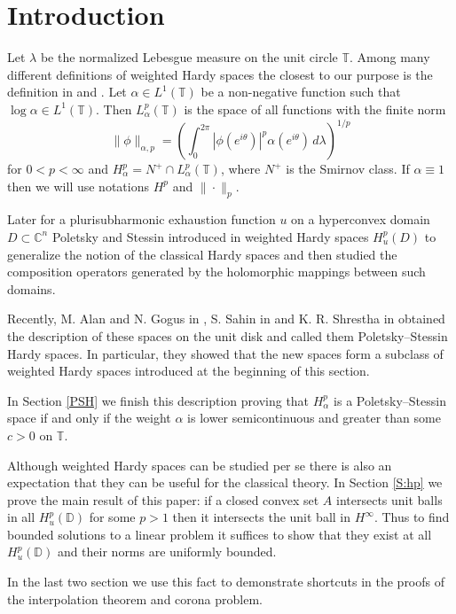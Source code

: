 \documentclass{amsart}
\theoremstyle{remark}
\begin{document}
\section{Introduction}
\par Let ${\lambda}$ be the normalized Lebesgue measure on the unit circle ${\mathbb T}$. Among many different definitions of weighted Hardy spaces the closest to our purpose is the definition in \cite{M} and \cite{BPST}. Let ${\alpha}\in L^1({\mathbb T})$ be a non-negative function such that $\log{\alpha}\in L^1({\mathbb T})$. Then $L^p_{\alpha}({\mathbb T})$ is the space of all functions with the finite norm \[\|\phi\|_{{\alpha},p}=\left(\int_0^{2\pi}|\phi(e^{i{\theta}})|^p{\alpha}(e^{i{\theta}})\,d{\lambda}\right)^{1/p}\] for $0<p<\infty$ and
$H^p_{\alpha}=N^+\cap L^p_{\alpha}({\mathbb T})$, where $N^+$ is the Smirnov class. If ${\alpha}\equiv1$ then we will use notations $H^p$ and $\|\cdot\|_p$.
\par Later for a plurisubharmonic exhaustion function $u$ on a hyperconvex domain $D{\subset}{\mathbb C}^n$ Poletsky and Stessin introduced in \cite{PS} weighted Hardy spaces $H^p_u(D)$ to generalize the notion of the classical Hardy spaces  and then studied the composition operators generated by the holomorphic mappings between such domains.
\par Recently, M. Alan and N. Gogus in \cite{AG}, S. Sahin in \cite{Sa} and K. R. Shrestha in \cite{Sh1,Sh2} obtained the description of these spaces on the unit disk and called them Poletsky--Stessin Hardy spaces. In particular, they showed that the new spaces form a subclass of weighted Hardy spaces introduced at the beginning of this section.
\par In Section \ref{PSH} we finish this description proving that $H^p_{\alpha}$ is a Poletsky--Stessin space if and only if the weight ${\alpha}$ is lower semicontinuous and greater than some $c>0$ on ${\mathbb T}$.
\par Although weighted Hardy spaces can be studied per se there is also an expectation that they can be useful for the classical theory. In Section \ref{S:hp} we prove the main result of this paper: if a closed convex set $A$ intersects unit balls in all $H^p_u({\mathbb D})$ for some $p>1$ then it intersects the unit ball in $H^\infty$. Thus to find bounded solutions to a linear problem it suffices to show that they exist at all $H^p_u({\mathbb D})$ and their norms are uniformly bounded.
\par In the last two section we use this fact to demonstrate shortcuts in the proofs of the interpolation theorem and corona problem.
\end{document}
